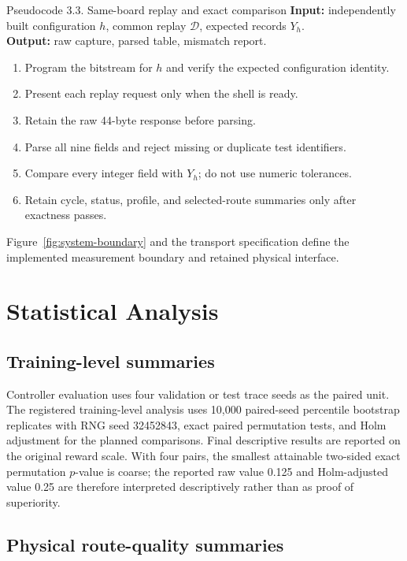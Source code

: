 \begin{pseudocode}{Pseudocode 3.3. Same-board replay and exact comparison}
\textbf{Input:} independently built configuration $h$, common replay $\mathcal D$,
expected records $Y_h$.\\
\textbf{Output:} raw capture, parsed table, mismatch report.
\begin{enumerate}
  \item Program the bitstream for $h$ and verify the expected configuration identity.
  \item Present each replay request only when the shell is ready.
  \item Retain the raw 44-byte response before parsing.
  \item Parse all nine fields and reject missing or duplicate test identifiers.
  \item Compare every integer field with $Y_h$; do not use numeric tolerances.
  \item Retain cycle, status, profile, and selected-route summaries only after exactness passes.
\end{enumerate}
\end{pseudocode}

Figure~\ref{fig:system-boundary} and the transport specification define the
implemented measurement boundary and retained physical interface.

\section{Statistical Analysis}

\subsection{Training-level summaries}

Controller evaluation uses four validation or test trace seeds as the paired unit.
The registered training-level analysis uses 10,000 paired-seed percentile bootstrap
replicates with RNG seed 32452843, exact paired permutation tests, and Holm
adjustment for the planned comparisons. Final descriptive results are reported on
the original reward scale. With four pairs, the smallest attainable two-sided exact
permutation $p$-value is coarse; the reported raw value 0.125 and Holm-adjusted value
0.25 are therefore interpreted descriptively rather than as proof of superiority.

\subsection{Physical route-quality summaries}

